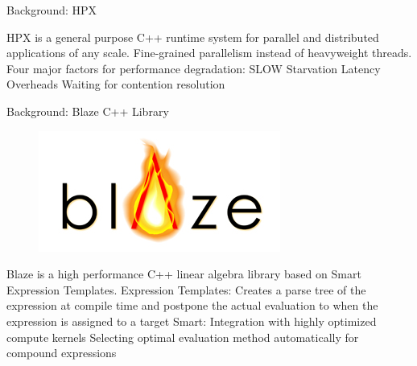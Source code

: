 \documentclass[10pt]{beamer}
\begin{document}
\begin{frame}{Background: HPX}
	\begin{outline}
		\1HPX is a general purpose C++ runtime system for parallel and distributed applications of any scale.
		\1Fine-grained parallelism instead of heavyweight threads.
		\1Four major factors for performance degradation: SLOW
		\2Starvation
		\2Latency
		\2Overheads
		\2Waiting for contention resolution
	\end{outline}
\end{frame}



\begin{frame}{Background: Blaze C++ Library}
\begin{outline}
\begin{figure}[H]

	\includegraphics[width=0.22\linewidth]{images/blaze.png}
\end{figure}	
Blaze is a high performance C++ linear algebra library based on Smart Expression Templates.
 \1Expression Templates:
	\2Creates a parse tree of the expression at compile time and postpone the actual evaluation to when the expression is assigned to a target
\1Smart: 
	\2Integration with highly optimized compute kernels
	\2Selecting optimal evaluation method automatically for compound expressions
\end{outline}
\end{frame}
\end{document}
